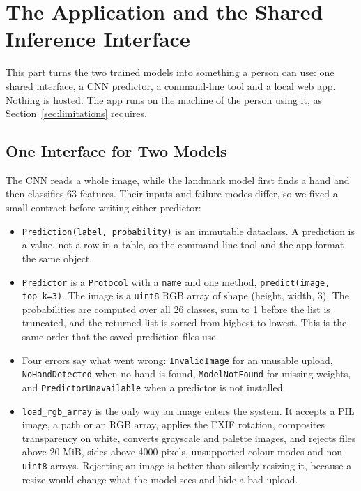 \section{The Application and the Shared Inference Interface}
\label{sec:inference-app}

This part turns the two trained models into something a person can use: one shared interface, a CNN predictor, a command-line tool and a local web app. Nothing is hosted. The app runs on the machine of the person using it, as Section~\ref{sec:limitations} requires.

\subsection{One Interface for Two Models}

The CNN reads a whole image, while the landmark model first finds a hand and then classifies 63 features. Their inputs and failure modes differ, so we fixed a small contract before writing either predictor:

\begin{itemize}
\item \texttt{Prediction(label, probability)} is an immutable dataclass. A prediction is a value, not a row in a table, so the command-line tool and the app format the same object.
\item \texttt{Predictor} is a \texttt{Protocol} with a \texttt{name} and one method, \texttt{predict(image, top\_k=3)}. The image is a \texttt{uint8} RGB array of shape (height, width, 3). The probabilities are computed over all 26 classes, sum to 1 before the list is truncated, and the returned list is sorted from highest to lowest. This is the same order that the saved prediction files use.
\item Four errors say what went wrong: \texttt{InvalidImage} for an unusable upload, \texttt{NoHandDetected} when no hand is found, \texttt{ModelNotFound} for missing weights, and \texttt{PredictorUnavailable} when a predictor is not installed.
\item \texttt{load\_rgb\_array} is the only way an image enters the system. It accepts a PIL image, a path or an RGB array, applies the EXIF rotation, composites transparency on white, converts grayscale and palette images, and rejects files above 20 MiB, sides above 4000 pixels, unsupported colour modes and non-\texttt{uint8} arrays. Rejecting an image is better than silently resizing it, because a resize would change what the model sees and hide a bad upload.
\end{itemize}

